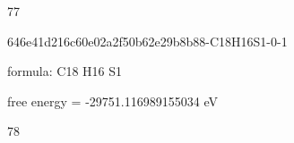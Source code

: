 \documentclass{article}
\begin{document}
77

\vspace{1cm}


646e41d216c60e02a2f50b62e29b8b88-C18H16S1-0-1



formula: C18 H16 S1



free energy = -29751.116989155034 eV

78
\end{document}
